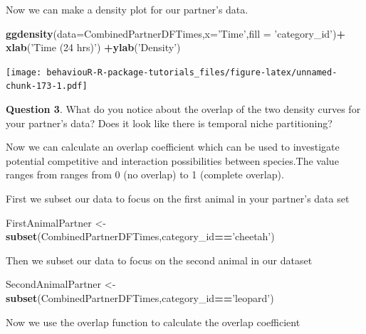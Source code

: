 \documentclass[]{book}
\newenvironment{Shaded}{\begin{snugshade}}{\end{snugshade}}
\newcommand{\DataTypeTok}[1]{\textcolor[rgb]{0.13,0.29,0.53}{#1}}
\newcommand{\KeywordTok}[1]{\textcolor[rgb]{0.13,0.29,0.53}{\textbf{#1}}}
\newcommand{\NormalTok}[1]{#1}
\newcommand{\OperatorTok}[1]{\textcolor[rgb]{0.81,0.36,0.00}{\textbf{#1}}}
\newcommand{\StringTok}[1]{\textcolor[rgb]{0.31,0.60,0.02}{#1}}
\begin{document}
Now we can make a density plot for our partner's data.

\begin{Shaded}
\begin{Highlighting}[]
\KeywordTok{ggdensity}\NormalTok{(}\DataTypeTok{data=}\NormalTok{CombinedPartnerDFTimes,}\DataTypeTok{x=}\StringTok{'Time'}\NormalTok{,}\DataTypeTok{fill =} \StringTok{'category_id'}\NormalTok{)}\OperatorTok{+}
\StringTok{  }\KeywordTok{xlab}\NormalTok{(}\StringTok{'Time (24 hrs)'}\NormalTok{) }\OperatorTok{+}\KeywordTok{ylab}\NormalTok{(}\StringTok{'Density'}\NormalTok{)}
\end{Highlighting}
\end{Shaded}

\texttt{[image: behaviouR-R-package-tutorials\_files/figure-latex/unnamed-chunk-173-1.pdf]}

\textbf{Question 3}. What do you notice about the overlap of the two density curves for your partner's data? Does it look like there is temporal niche partitioning?

Now we can calculate an overlap coefficient which can be used to investigate potential competitive and interaction possibilities between species.The value ranges from ranges from 0 (no overlap) to 1 (complete overlap).

First we subset our data to focus on the first animal in your partner's data set

\begin{Shaded}
\begin{Highlighting}[]
\NormalTok{FirstAnimalPartner <-}\StringTok{ }\KeywordTok{subset}\NormalTok{(CombinedPartnerDFTimes,category_id}\OperatorTok{==}\StringTok{'cheetah'}\NormalTok{)}
\end{Highlighting}
\end{Shaded}

Then we subset our data to focus on the second animal in our dataset

\begin{Shaded}
\begin{Highlighting}[]
\NormalTok{SecondAnimalPartner <-}\StringTok{ }\KeywordTok{subset}\NormalTok{(CombinedPartnerDFTimes,category_id}\OperatorTok{==}\StringTok{'leopard'}\NormalTok{)}
\end{Highlighting}
\end{Shaded}

Now we use the overlap function to calculate the overlap coefficient

\begin{Shaded}
\end{Shaded}
\end{document}
